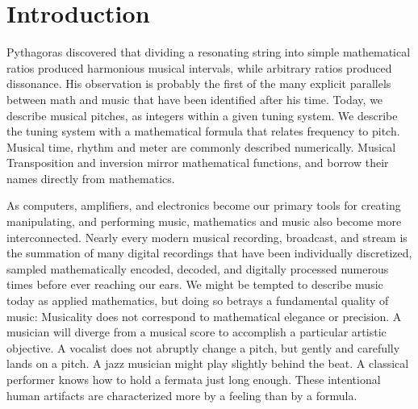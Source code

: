 \cleardoublepage
\chapter{Introduction}
\label{ch:introduction}
\begin{fullwidth}
   Pythagoras discovered that
  dividing a resonating string into simple mathematical ratios
  produced harmonious musical intervals, while arbitrary ratios
  produced dissonance.  His observation is probably the first of the
  many explicit parallels between math and music that have been
  identified after his time. Today, we describe musical pitches, as
  integers within a given tuning system. We describe the tuning system
  with a mathematical formula that relates frequency to pitch. Musical
  time, rhythm and meter are commonly described numerically. Musical
  Transposition and inversion mirror mathematical functions, and
  borrow their names directly from mathematics.
\end{fullwidth}

As computers, amplifiers, and electronics become our primary tools for
creating manipulating, and performing music, mathematics and music
also become more interconnected. Nearly every modern musical
recording, broadcast, and stream is the summation of many digital
recordings that have been individually discretized, sampled
mathematically encoded, decoded, and digitally processed numerous
times before ever reaching our ears.\cite{Case2007} We might be
tempted to describe music today as applied mathematics, but doing so
betrays a fundamental quality of music: Musicality does not correspond
to mathematical elegance or precision. A musician will diverge from a
musical score to accomplish a particular artistic objective. A
vocalist does not abruptly change a pitch, but gently and carefully
lands on a pitch. A jazz musician might play slightly behind the
beat. A classical performer knows how to hold a fermata just long
enough. These intentional human artifacts are characterized more by a
feeling than by a formula.

